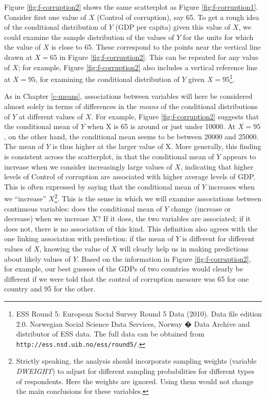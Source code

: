 \documentclass[11pt,a4paper,openany]{book}
\let\rmarkdownfootnote\footnote%
\def\footnote{\protect\rmarkdownfootnote}
\begin{document}
Figure \ref{fig:f-corruption2} shows the same scatterplot as Figure
\ref{fig:f-corruption1}. Consider first one value of \(X\) (Control of
corruption), say 65. To get a rough idea of the conditional distribution
of \(Y\) (GDP per capita) given this value of \(X\), we could examine
the sample distribution of the values of \(Y\) for the units for which
the value of \(X\) is close to 65. These correspond to the points near
the vertical line drawn at \(X=65\) in Figure \ref{fig:f-corruption2}.
This can be repeated for any value of \(X\); for example, Figure
\ref{fig:f-corruption2} also includes a vertical reference line at
\(X=95\), for examining the conditional distribution of \(Y\) given
\(X=95\)\footnote{ESS Round 5: European Social Survey Round 5 Data
  (2010). Data file edition 2.0. Norwegian Social Science Data Services,
  Norway � Data Archive and distributor of ESS data. The full data can
  be obtained from \texttt{http://ess.nsd.uib.no/ess/round5/}.}.

As in Chapter \ref{c-means}, associations between variables will here be
considered almost solely in terms of differences in the \emph{means} of
the conditional distributions of \(Y\) at different values of \(X\). For
example, Figure \ref{fig:f-corruption2} suggests that the conditional
mean of \(Y\) when X is 65 is around or just under 10000. At \(X=95\),
on the other hand, the conditional mean seems to be between 20000 and
25000. The mean of \(Y\) is thus higher at the larger value of X. More
generally, this finding is consistent across the scatterplot, in that
the conditional mean of \(Y\) appears to increase when we consider
increasingly large values of \(X\), indicating that higher levels of
Control of corruption are associated with higher average levels of GDP.
This is often expressed by saying that the conditional mean of \(Y\)
increases when we ``increase'' \(X\)\footnote{Strictly speaking, the
  analysis should incorporate sampling weights (variable \emph{DWEIGHT})
  to adjust for different sampling probabilities for different types of
  respondents. Here the weights are ignored. Using them would not change
  the main conclusions for these variables.}. This is the sense in which
we will examine associations between continuous variables: does the
conditional mean of \(Y\) change (increase or decrease) when we increase
\(X\)? If it does, the two variables are associated; if it does not,
there is no association of this kind. This definition also agrees with
the one linking association with prediction: if the mean of \(Y\) is
different for different values of \(X\), knowing the value of \(X\) will
clearly help us in making predictions about likely values of \(Y\).
Based on the information in Figure \ref{fig:f-corruption2}, for example,
our best guesses of the GDPs of two countries would clearly be different
if we were told that the control of corruption measure was 65 for one
country and 95 for the other.
\end{document}
